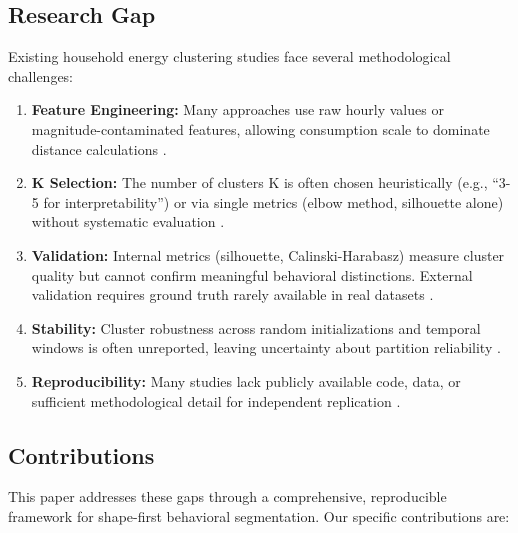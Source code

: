 \subsection{Research Gap}

Existing household energy clustering studies face several methodological challenges:

\begin{enumerate}
    \item \textbf{Feature Engineering:} Many approaches use raw hourly values or magnitude-contaminated features, allowing consumption scale to dominate distance calculations \cite{kwac2014household,rhodes2014clustering}.
    
    \item \textbf{K Selection:} The number of clusters K is often chosen heuristically (e.g., ``3-5 for interpretability'') or via single metrics (elbow method, silhouette alone) without systematic evaluation \cite{hennig2020comparing}.
    
    \item \textbf{Validation:} Internal metrics (silhouette, Calinski-Harabasz) measure cluster quality but cannot confirm meaningful behavioral distinctions. External validation requires ground truth rarely available in real datasets \cite{gates2019adjusted}.
    
    \item \textbf{Stability:} Cluster robustness across random initializations and temporal windows is often unreported, leaving uncertainty about partition reliability \cite{henning2020adjusting}.
    
    \item \textbf{Reproducibility:} Many studies lack publicly available code, data, or sufficient methodological detail for independent replication \cite{peng2011reproducible}.
\end{enumerate}

\subsection{Contributions}

This paper addresses these gaps through a comprehensive, reproducible framework for shape-first behavioral segmentation. Our specific contributions are:

